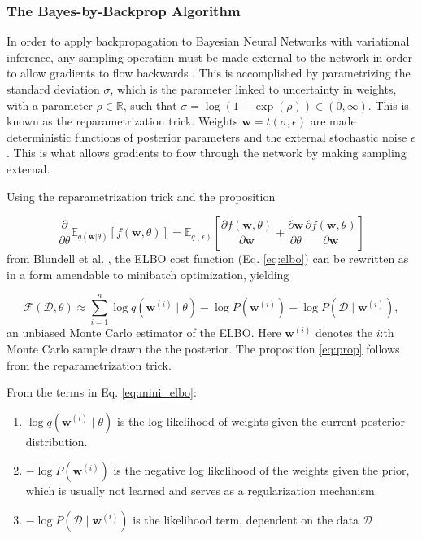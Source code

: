 	\subsubsection*{The Bayes-by-Backprop Algorithm}

	In order to apply backpropagation to Bayesian Neural Networks with variational inference, any sampling operation must be made external to the network in order to allow gradients to flow backwards \cite{blundell_weight_2015}. This is accomplished by parametrizing the standard deviation $\sigma$, which is the parameter linked to uncertainty in weights, with a parameter $\rho \in \mathbb{R}$, such that $\sigma = \log(1 + \exp(\rho)) \in (0,\infty)$. 
	This is known as the reparametrization trick. Weights $\pmb{w} = t(\sigma, \epsilon)$ are made deterministic functions of posterior parameters and the external stochastic noise $\epsilon$. This is what allows gradients to flow through the network by making sampling external. 
	
	Using the reparametrization trick and the proposition
	
	\begin{equation}
	\label{eq:prop}
	\frac{\partial}{\partial \theta} \mathbb{E}_{q(\pmb{w}|\theta)}[f(\pmb{w}, \theta)] =
	\mathbb{E}_{q(\epsilon)}\left[\frac{\partial f(\pmb{w}, \theta)}{\partial \pmb{w}} + \frac{\partial \pmb{w}}{\partial \theta}
	\frac{\partial f(\pmb{w}, \theta)}{\partial \pmb{w}}\right]
	\end{equation}
	from Blundell et al. \cite{blundell_weight_2015}, the ELBO cost function (Eq. \eqref{eq:elbo}) can be rewritten as in a form amendable to minibatch optimization, yielding
	
	\begin{equation}
	\label{eq:mini_elbo}
	\mathcal{F}(\mathcal{D}, \theta) \approx \sum_{i=1}^{n}\log q(\pmb{w}^{(i)}\mid\theta) - \log P(\pmb{w}^{(i)}) - \log P(\mathcal{D}\mid\pmb{w}^{(i)}),
	\end{equation}
	an unbiased Monte Carlo estimator of the ELBO. Here $\pmb{w}^{(i)}$ denotes the $i$:th Monte Carlo sample drawn the the posterior. The proposition \eqref{eq:prop} follows from the reparametrization trick.
	
	From the terms in Eq. \eqref{eq:mini_elbo}:
	\begin{enumerate}
		\item $\log q(\pmb{w}^{(i)} \mid \theta)$ is the log likelihood of weights given the current posterior distribution.
		
		\item $-\log P(\pmb{w}^{(i)})$ is the negative log likelihood of the weights given the prior, which is usually not learned and serves as a regularization mechanism. 
		
		\item $- \log P(\mathcal{D} \mid \pmb{w}^{(i)})$ is the likelihood term, dependent on the data $\mathcal{D}$
	\end{enumerate}
	
